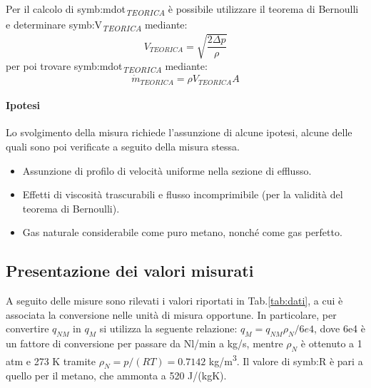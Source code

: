 Per il calcolo di \gls{symb:mdot}\textsubscript{\textit{TEORICA}} è possibile utilizzare il teorema di Bernoulli e determinare \gls{symb:V}\textsubscript{\textit{TEORICA}} mediante: 
\begin{equation}
	V_{\textit{TEORICA}} = \sqrt{\frac{2\Delta p}{\rho}} \label{eq:velocità}
\end{equation}
per poi trovare \gls{symb:mdot}\textsubscript{\textit{TEORICA}} mediante:
\begin{equation}
	\dot{m}_{\textit{TEORICA}}=\rho	V_{\textit{TEORICA}} A \label{eq:portata}
\end{equation}


\paragraph{Ipotesi}
Lo svolgimento della misura richiede l'assunzione di alcune ipotesi, alcune delle quali sono poi verificate a seguito della misura stessa. 

\begin{itemize}
	\item Assunzione di profilo di velocità uniforme nella sezione di efflusso.
	\item Effetti di viscosità trascurabili e flusso incomprimibile (per la validità del teorema di Bernoulli).
	\item Gas naturale considerabile come puro metano, nonché come gas perfetto.
\end{itemize}

\subsection{Presentazione dei valori misurati}
A seguito delle misure sono rilevati i valori riportati in Tab.\ref{tab:dati}, a cui è associata la conversione nelle unità di misura opportune. In particolare, per convertire $q_{NM}$ in $q_M$ si utilizza la seguente relazione: $q_M=q_{NM} \rho_N /6e4$, dove 6e4 è un fattore di conversione per passare da Nl/min a kg/s, mentre $\rho_N$ è ottenuto a 1 atm e 273 K tramite $\rho_N = p/(RT) = 0.7142$ kg/m\textsuperscript{3}. Il valore di \gls{symb:R} è pari a quello per il metano, che ammonta a 520 J/(kgK).

